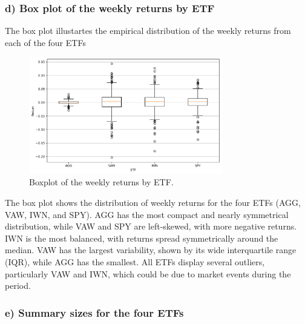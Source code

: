 \documentclass{rapport}
\begin{document}
\subsubsection*{\textbf{d)} Box plot of the weekly returns by ETF}
The box plot illustartes the empirical distribution of the weekly returns from each of the four ETFs
\begin{figure}[H]
    \centering
    \includegraphics[width=0.75\textwidth]{figure_6_boxplot_of_returns.png}  %
    \caption{\small Boxplot of the weekly returns by ETF.}  %
    \label{fig:histogram_AGG}
\end{figure}
\noindent
\noindent
The box plot shows the distribution of weekly returns for the four ETFs (AGG, VAW, IWN, and SPY). 
AGG has the most compact and nearly symmetrical distribution, while VAW and SPY are left-skewed, with more negative returns. 
IWN is the most balanced, with returns spread symmetrically around the median. 
VAW has the largest variability, shown by its wide interquartile range (IQR), while AGG has the smallest. 
All ETFs display several outliers, particularly VAW and IWN, which could be due to market events during the period.

\subsubsection*{\textbf{e)} Summary sizes for the four ETFs}
\end{document}
